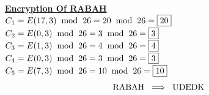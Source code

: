 \vspace{0.5cm}
\textbf{\underline{Encryption Of RABAH}}\\[0.2cm]
\(C_1 = E(17,3) \hspace{0.2cm} \text{mod} \hspace{0.2cm} 26 = 20 \hspace{0.2cm} \text{mod} \hspace{0.2cm} 26 = \boxed{20}\)\\[0.15cm]
\(C_2 = E(0,3) \hspace{0.2cm} \text{mod} \hspace{0.2cm} 26 = 3 \hspace{0.2cm} \text{mod} \hspace{0.2cm} 26 = \boxed{3}\)\\[0.15cm]
\(C_3 = E(1,3) \hspace{0.2cm} \text{mod} \hspace{0.2cm} 26 = 4 \hspace{0.2cm} \text{mod} \hspace{0.2cm} 26 = \boxed{4}\)\\[0.15cm]
\(C_4 = E(0,3) \hspace{0.2cm} \text{mod} \hspace{0.2cm} 26 = 3 \hspace{0.2cm} \text{mod} \hspace{0.2cm} 26 = \boxed{3}\)\\[0.15cm]
\(C_5 = E(7,3) \hspace{0.2cm} \text{mod} \hspace{0.2cm} 26 = 10 \hspace{0.2cm} \text{mod} \hspace{0.2cm} 26 = \boxed{10}\)\\[0.15cm]

\[\text{RABAH} \hspace{0.2cm} \Longrightarrow \hspace{0.2cm} \text{UDEDK} \]

